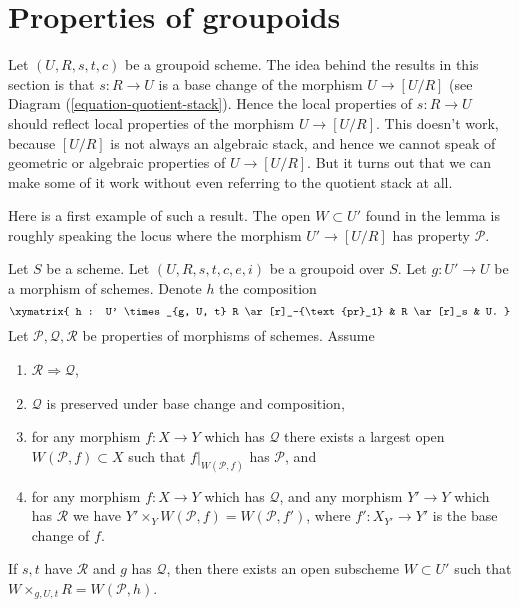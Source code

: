 \section{Properties of groupoids}
\label{section-technical-lemma}

\noindent
Let $(U, R, s, t, c)$ be a groupoid scheme.
The idea behind the results in this section is that $s: R \to U$
is a base change of the morphism $U \to [U/R]$ (see
Diagram (\ref{equation-quotient-stack}).
Hence the local properties of $s : R \to U$ should reflect local
properties of the morphism $U \to [U/R]$.
This doesn't work, because $[U/R]$ is not always an algebraic stack, and
hence we cannot speak of geometric or algebraic properties of
$U \to [U/R]$.
But it turns out that we can make some of it work without even
referring to the quotient stack at all.

\medskip\noindent
Here is a first example of such a result. The open $W \subset U'$ found
in the lemma is roughly speaking the locus where the morphism
$U' \to [U/R]$ has property $\mathcal{P}$.

\begin{lemma}
\label{lemma-local-source}
Let $S$ be a scheme.
Let $(U, R, s, t, c, e, i)$ be a groupoid over $S$.
Let $g : U' \to U$ be a morphism of schemes.
Denote $h$ the composition
$$
\xymatrix{
h : U' \times_{g, U, t} R \ar[r]_-{\text{pr}_1} & R \ar[r]_s & U.
}
$$
Let $\mathcal{P}, \mathcal{Q}, \mathcal{R}$ be properties of morphisms
of schemes. Assume
\begin{enumerate}
\item $\mathcal{R} \Rightarrow \mathcal{Q}$,
\item $\mathcal{Q}$ is preserved under base change and composition,
\item for any morphism $f : X \to Y$ which has $\mathcal{Q}$ there exists a
largest open $W(\mathcal{P}, f) \subset X$ such that $f|_{W(\mathcal{P}, f)}$
has $\mathcal{P}$, and
\item for any morphism $f : X \to Y$ which has $\mathcal{Q}$,
and any morphism $Y' \to Y$ which has $\mathcal{R}$ we have
$Y' \times_Y W(\mathcal{P}, f) = W(\mathcal{P}, f')$, where
$f' : X_{Y'} \to Y'$ is the base change of $f$.
\end{enumerate}
If $s, t$ have $\mathcal{R}$ and $g$ has $\mathcal{Q}$, then
there exists an open subscheme $W \subset U'$ such that
$W \times_{g, U, t} R = W(\mathcal{P}, h)$.
\end{lemma}

